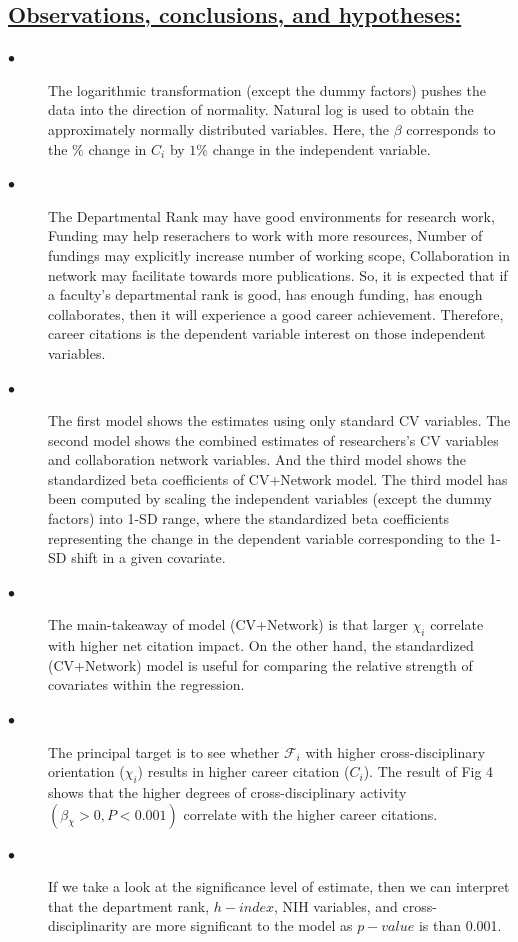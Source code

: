\documentclass{article}\usepackage[]{graphicx}\usepackage[]{color}
\begin{document}
\subsection*{\underline{Observations, conclusions, and hypotheses:}}
\begin{description}
  \item[$\bullet$] The logarithmic transformation (except the dummy factors) pushes the data into the direction of normality. Natural log is used to obtain the approximately normally distributed variables. Here, the $\beta$ corresponds to the $\%$ change in $C_i$ by $1\%$ change in the independent variable.
  \item[$\bullet$] The Departmental Rank may have good environments for research work, Funding may help reserachers to work with more resources, Number of fundings may explicitly increase number of working scope, Collaboration in network may facilitate towards more publications. So, it is expected that if a faculty’s departmental rank is good, has enough funding, has enough collaborates, then it will experience a good career achievement. Therefore, career citations is the dependent variable interest on those independent variables. 
  \item[$\bullet$] The first model shows the estimates using only standard CV variables. The second model shows the combined estimates of researchers's CV variables and collaboration network variables. And the third model shows the standardized beta coefficients of CV+Network model. The third model has been computed by scaling the independent variables (except the dummy factors) into 1-SD range, where the standardized beta coefficients representing the change in the dependent variable corresponding to the 1-SD shift in a given covariate.
  \item[$\bullet$] The main-takeaway of model (CV+Network) is that larger $\chi_i$ correlate with higher net citation impact. On the other hand, the standardized (CV+Network) model is useful for comparing the relative strength of covariates within the regression.
  \item[$\bullet$] The principal target is to see whether $\mathcal{F}_i$ with higher cross-disciplinary orientation ($\chi_i$) results in higher career citation ($C_i$). The result of Fig 4 shows that the higher degrees of cross-disciplinary activity $(\beta_{\chi} > 0, P < 0.001)$ correlate with the higher career citations. 
  \item[$\bullet$] If we take a look at the significance level of estimate, then we can interpret that the department rank, $h-index$, NIH variables, and cross-disciplinarity are more significant to the model as $p-value$ is than 0.001. 

\end{description}
\end{document}
